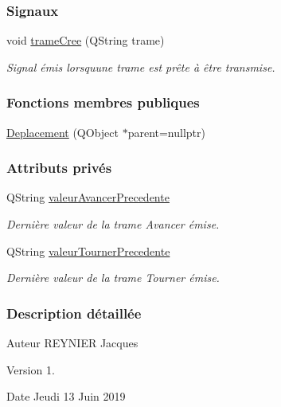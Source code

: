 \subsubsection*{Signaux}
\begin{DoxyCompactItemize}
\item 
void \hyperlink{class_deplacement_ae1a6d4a98304dee19d426ceeb6b7d5bb}{trame\+Cree} (Q\+String trame)
\begin{DoxyCompactList}\small\item\em Signal émis lorsqu\textquotesingle{}une trame est prête à être transmise. \end{DoxyCompactList}\end{DoxyCompactItemize}
\subsubsection*{Fonctions membres publiques}
\begin{DoxyCompactItemize}
\item 
\hyperlink{class_deplacement_a473f623358ffa95ac7385b49f128d23c}{Deplacement} (Q\+Object $\ast$parent=nullptr)
\end{DoxyCompactItemize}
\subsubsection*{Attributs privés}
\begin{DoxyCompactItemize}
\item 
Q\+String \hyperlink{class_deplacement_a419b8bb201dc4a4e927beed68923f8eb}{valeur\+Avancer\+Precedente}
\begin{DoxyCompactList}\small\item\em Dernière valeur de la trame Avancer émise. \end{DoxyCompactList}\item 
Q\+String \hyperlink{class_deplacement_a9d9b191747038f0f410626f38c4e75be}{valeur\+Tourner\+Precedente}
\begin{DoxyCompactList}\small\item\em Dernière valeur de la trame Tourner émise. \end{DoxyCompactList}\end{DoxyCompactItemize}


\subsubsection{Description détaillée}
\begin{DoxyAuthor}{Auteur}
R\+E\+Y\+N\+I\+ER Jacques
\end{DoxyAuthor}
\begin{DoxyVersion}{Version}
1.
\end{DoxyVersion}
\begin{DoxyDate}{Date}
Jeudi 13 Juin 2019 
\end{DoxyDate}


